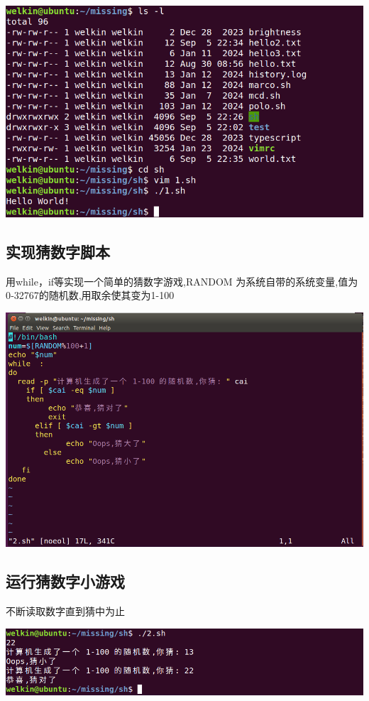 \documentclass[UTF8,a4paper]{ctexart}
\begin{document}
\begin{sloppypar}
	\includegraphics[width = 16cm]{13}
	
	\subsection{实现猜数字脚本}
	用while，if等实现一个简单的猜数字游戏,RANDOM 为系统自带的系统变量,值为 0‐32767的随机数,用取余使其变为1-100
	
	\includegraphics[width = 16cm]{14}
	
	\subsection{运行猜数字小游戏}
	不断读取数字直到猜中为止
	
	\includegraphics[width = 16cm]{15}
	

\end{sloppypar}
\end{document}
